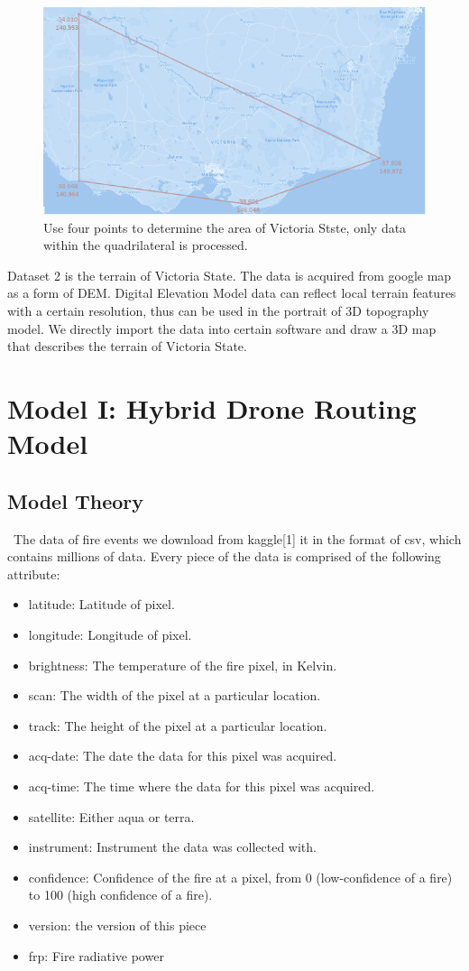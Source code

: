 \documentclass{mcmthesis}
\begin{document}
\begin{figure}[h]
	\small
	\centering
	\includegraphics[width=0.8\linewidth]{Figure/Victoria.png}
	\caption{Use four points to determine the area of Victoria Stste, only data within the quadrilateral is processed.} \label{fig:Victoria}
\end{figure}

Dataset 2 is the terrain of Victoria State. The data is acquired from google map as a form of DEM. Digital Elevation Model data can reflect local terrain features with a certain resolution, thus can be used in the portrait of 3D topography model. We directly import the data into certain software and draw a 3D map that describes the terrain of Victoria State.

\section{Model I: Hybrid Drone Routing Model}
\subsection{Model Theory}
\quad \, The data of fire events we download from kaggle[1] it in the format of csv, which contains millions of data. Every piece of the data is comprised of the following attribute:
\begin{itemize}
	\item latitude: Latitude of pixel.
	\item longitude: Longitude of pixel.
	\item brightness: The temperature of the fire pixel, in Kelvin.
	\item scan: The width of the pixel at a particular location.
	\item track: The height of the pixel at a particular location.
	\item acq-date: The date the data for this pixel was acquired.
	\item acq-time: The time where the data for this pixel was acquired.
	\item satellite: Either aqua or terra.
	\item instrument: Instrument the data was collected with.
	\item confidence: Confidence of the fire at a pixel, from 0 (low-confidence of a fire) to 100 (high confidence of a fire).
	\item version: the version of this piece
	\item frp: Fire radiative power
\end{itemize}
\end{document}
